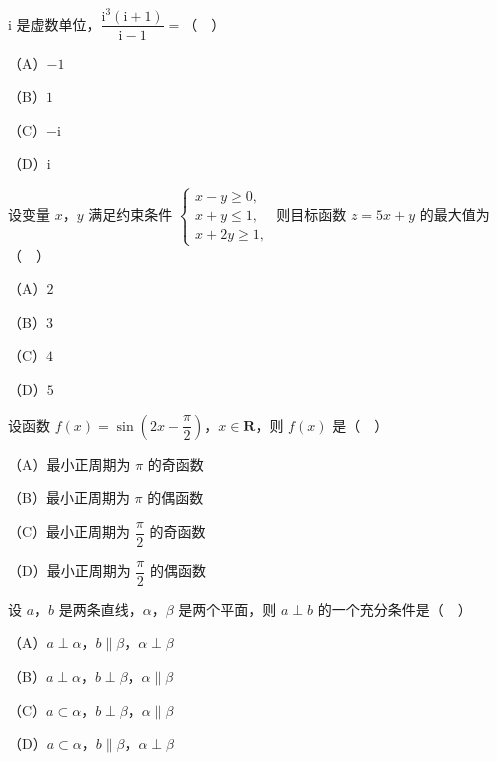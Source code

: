 


\begin{question}
$\mathrm i$ 是虚数单位，$\dfrac{\mathrm i^3(\mathrm i+1)}{\mathrm i-1}=$（　）

（A）$-1$

（B）$1$

（C）$-\mathrm i$

（D）$\mathrm i$

\end{question}
\begin{question}
设变量 $x$，$y$ 满足约束条件 $\begin{cases}x-y\geqslant0,\\ x+y\leqslant1,\\ x+2y\geqslant1,\end{cases}$ 则目标函数 $z=5x+y$ 的最大值为（　）

（A）$2$

（B）$3$

（C）$4$

（D）$5$

\end{question}
\begin{question}
设函数 $f(x)=\sin\left(2x-\dfrac{\pi}2\right)$，$x\in\mathbf R$，则 $f(x)$ 是（　）

（A）最小正周期为 $\pi$ 的奇函数

（B）最小正周期为 $\pi$ 的偶函数

（C）最小正周期为 $\dfrac{\pi}2$ 的奇函数

（D）最小正周期为 $\dfrac{\pi}2$ 的偶函数

\end{question}
\begin{question}
设 $a$，$b$ 是两条直线，$\alpha$，$\beta$ 是两个平面，则 $a\perp b$ 的一个充分条件是（　）

（A）$a\perp\alpha$，$b\parallel\beta$，$\alpha\perp\beta$

（B）$a\perp\alpha$，$b\perp\beta$，$\alpha\parallel\beta$

（C）$a\subset\alpha$，$b\perp\beta$，$\alpha\parallel\beta$

（D）$a\subset\alpha$，$b\parallel\beta$，$\alpha\perp\beta$

\end{question}
